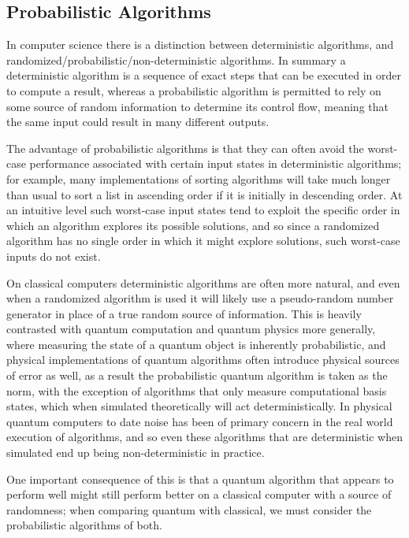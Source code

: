 \subsection{Probabilistic Algorithms}
In computer science there is a distinction between deterministic algorithms, and randomized/probabilistic/non-deterministic algorithms. In summary a deterministic algorithm is a sequence of exact steps that can be executed in order to compute a result, whereas a probabilistic algorithm is permitted to rely on some source of random information to determine its control flow, meaning that the same input could result in many different outputs.

The advantage of probabilistic algorithms is that they can often avoid the worst-case performance associated with certain input states in deterministic algorithms; for example, many implementations of sorting algorithms will take much longer than usual to sort a list in ascending order if it is initially in descending order. At an intuitive level such worst-case input states tend to exploit the specific order in which an algorithm explores its possible solutions, and so since a randomized algorithm has no single order in which it might explore solutions, such worst-case inputs do not exist.

On classical computers deterministic algorithms are often more natural, and even when a randomized algorithm is used it will likely use a pseudo-random number generator in place of a true random source of information. This is heavily contrasted with quantum computation and quantum physics more generally, where measuring the state of a quantum object is inherently probabilistic, and physical implementations of quantum algorithms often introduce physical sources of error as well, as a result the probabilistic quantum algorithm is taken as the norm, with the exception of algorithms that only measure computational basis states, which when simulated theoretically will act deterministically. In physical quantum computers to date noise has been of primary concern in the real world execution of algorithms, and so even these algorithms that are deterministic when simulated end up being non-deterministic in practice.

One important consequence of this is that a quantum algorithm that appears to perform well might still perform better on a classical computer with a source of randomness; when comparing quantum with classical, we must consider the probabilistic algorithms of both.

